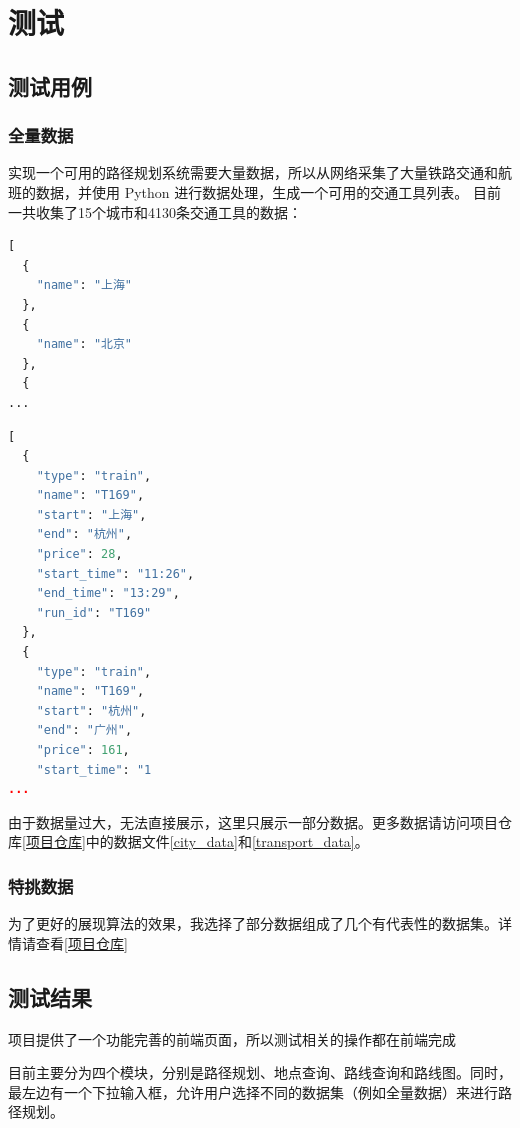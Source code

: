 \documentclass[10pt]{article}
\begin{document}
    \section{测试}

    \subsection{测试用例}

    \subsubsection{全量数据}

    实现一个可用的路径规划系统需要大量数据，所以从网络采集了大量铁路交通和航班的数据，并使用 Python 进行数据处理，生成一个可用的交通工具列表。
    目前一共收集了15个城市和4130条交通工具的数据：
    \begin{lstlisting}[language=Python]
[
  {
    "name": "上海"
  },
  {
    "name": "北京"
  },
  {
...
    \end{lstlisting}

    \begin{lstlisting}[language=Python]
[
  {
    "type": "train",
    "name": "T169",
    "start": "上海",
    "end": "杭州",
    "price": 28,
    "start_time": "11:26",
    "end_time": "13:29",
    "run_id": "T169"
  },
  {
    "type": "train",
    "name": "T169",
    "start": "杭州",
    "end": "广州",
    "price": 161,
    "start_time": "1
...
    \end{lstlisting}
    由于数据量过大，无法直接展示，这里只展示一部分数据。更多数据请访问项目仓库\ref{项目仓库}中的数据文件\ref{city_data}和\ref{transport_data}。
    \subsubsection{特挑数据}
    为了更好的展现算法的效果，我选择了部分数据组成了几个有代表性的数据集。详情请查看\ref{项目仓库}

    \subsection{测试结果}
    项目提供了一个功能完善的前端页面，所以测试相关的操作都在前端完成


    目前主要分为四个模块，分别是路径规划、地点查询、路线查询和路线图。同时，最左边有一个下拉输入框，允许用户选择不同的数据集（例如全量数据）来进行路径规划。
\end{document}
